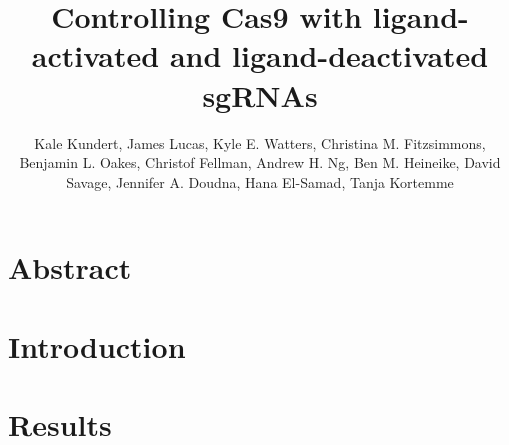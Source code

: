 \documentclass[10pt,oneside]{article}
\begin{document}
\title{Controlling Cas9 with ligand-activated and ligand-deactivated sgRNAs}
\author{Kale Kundert, James Lucas, Kyle E. Watters, Christina M. Fitzsimmons, 
Benjamin L. Oakes, Christof Fellman, Andrew H. Ng, Ben M. Heineike, David Savage, Jennifer A.  
Doudna, Hana El-Samad, Tanja Kortemme}
\maketitle{}


\section{Abstract}

\section{Introduction}

\section{Results}

%
\end{document}
